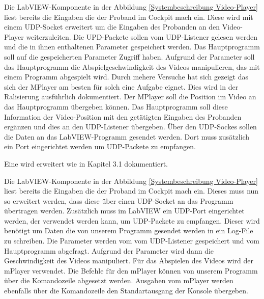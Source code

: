 Die LabVIEW-Komponente in der Abbildung \ref{Systembeschreibung Video-Player} liest bereits die Eingaben die der Proband im Cockpit mach ein. Diese wird mit einem UDP-Socket erweitert um die Eingaben des Probanden an den Video-Player weiterzuleiten. Die UPD-Packete sollen vom UDP-Listener gelesen werden und die in ihnen enthaltenen Parameter gespeichert werden. Das Hauptprogramm soll auf die gespeicherten Parameter Zugriff haben. Aufgrund der Parameter soll das Hauptprogramm die Abspielgeschwindigkeit des Videos manipulieren, das mit einem Programm abgespielt wird. Durch mehere Versuche hat sich gezeigt das sich der MPlayer am besten für solch eine Aufgabe eignet. Dies wird in der Ralisierung ausführlich dokumentiert. Der MPlayer soll die Position im Video an das Hauptprogramm übergeben können. Das Hauptprogramm soll diese Information der Video-Position mit den getätigten Eingaben des Probanden ergänzen und dies an den UDP-Listener übergeben. Über den UDP-Sockes sollen die Daten an das LabVIEW-Programm gesendet werden. Dort muss zusätzlich ein Port eingerichtet werden um UDP-Packete zu empfangen. 

Eine wird erweitert wie in Kapitel 3.1 dokumentiert. 


Die LabVIEW-Komponente in der Abbildung \ref{Systembeschreibung Video-Player} liest bereits die Eingaben die der Proband im Cockpit mach ein. Dieses muss nun so erweitert werden, dass diese über einen UDP-Socket an das Programm übertragen werden. Zusätzlich muss im LabVIEW ein UDP-Port eingerichtet werden, der verwendet werden kann, um UDP-Packete zu empfangen. Dieser wird benötigt um Daten die von unserem Programm gesendet werden in ein Log-File zu schreiben.
Die Parameter werden vom vom UDP-Listener gespeichert und vom Hauptprogramm abgefragt. Aufgrund der Parameter wird dann die Geschwindigkeit des Videos manipuliert. Für das Abspielen des Videos wird der mPlayer verwendet. Die Befehle für den mPlayer können von unserem Programm über die Komandozeile abgesetzt werden. Ausgaben vom mPlayer  werden ebenfalls über die Komandozeile den Standartausgang der Konsole übergeben. 

